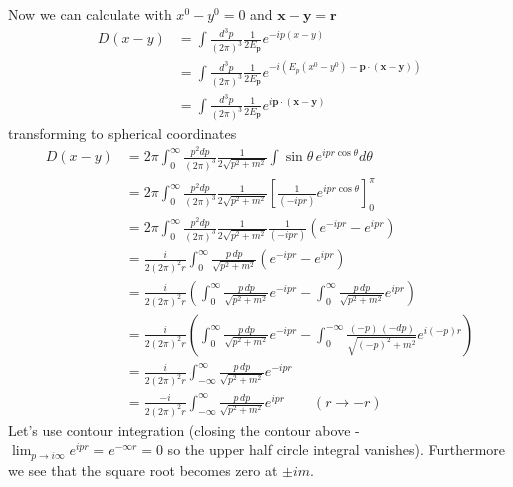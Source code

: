 \documentclass[10pt,a4paper]{book}
\theoremstyle{definition}
\begin{document}
Now we can calculate with $x^0-y^0=0$ and $\mathbf{x}-\mathbf{y}=\mathbf{r}$
\begin{align}
D(x-y)
&=\int\frac{d^3p}{(2\pi)^3}\frac{1}{2E_\mathbf{p}}e^{-ip(x-y)}\\
&=\int\frac{d^3p}{(2\pi)^3}\frac{1}{2E_\mathbf{p}}e^{-i(E_p(x^0-y^0)-\mathbf{p}\cdot(\mathbf{x}-\mathbf{y}))}\\
&=\int\frac{d^3p}{(2\pi)^3}\frac{1}{2E_\mathbf{p}}e^{i\mathbf{p}\cdot(\mathbf{x}-\mathbf{y})}
\end{align}
transforming to spherical coordinates
\begin{align}
D(x-y)
&=2\pi\int_0^\infty\frac{p^2dp}{(2\pi)^3}\frac{1}{2\sqrt{p^2+m^2}}\int\sin\theta \,e^{ipr\cos\theta}d\theta\\
&=2\pi\int_0^\infty\frac{p^2dp}{(2\pi)^3}\frac{1}{2\sqrt{p^2+m^2}}\left[\frac{1}{(-ipr)}e^{ipr\cos\theta}\right]_0^\pi\\
&=2\pi\int_0^\infty\frac{p^2dp}{(2\pi)^3}\frac{1}{2\sqrt{p^2+m^2}}\frac{1}{(-ipr)}(e^{-ipr}-e^{ipr})\\
&=\frac{i}{2(2\pi)^2r}\int_0^\infty\frac{p\,dp}{\sqrt{p^2+m^2}}(e^{-ipr}-e^{ipr})\\
&=\frac{i}{2(2\pi)^2r}\left(\int_0^\infty\frac{p\,dp}{\sqrt{p^2+m^2}}e^{-ipr}-\int_0^\infty\frac{p\,dp}{\sqrt{p^2+m^2}}e^{ipr}\right)\\
&=\frac{i}{2(2\pi)^2r}\left(\int_0^\infty\frac{p\,dp}{\sqrt{p^2+m^2}}e^{-ipr}-\int_0^{-\infty}\frac{(-p)\,(-dp)}{\sqrt{(-p)^2+m^2}}e^{i(-p)r}\right)\\
&=\frac{i}{2(2\pi)^2r}\int_{-\infty}^\infty\frac{p\,dp}{\sqrt{p^2+m^2}}e^{-ipr}\\
&=\frac{-i}{2(2\pi)^2r}\int_{-\infty}^\infty\frac{p\,dp}{\sqrt{p^2+m^2}}e^{ipr}\qquad (r\rightarrow-r)
\end{align}
Let's use contour integration (closing the contour above - $\lim_{p\rightarrow i\infty}e^{ipr}=e^{-\infty r}=0$ so the upper half circle integral vanishes). Furthermore we see that the square root becomes zero at $\pm im$. 
\end{document}
